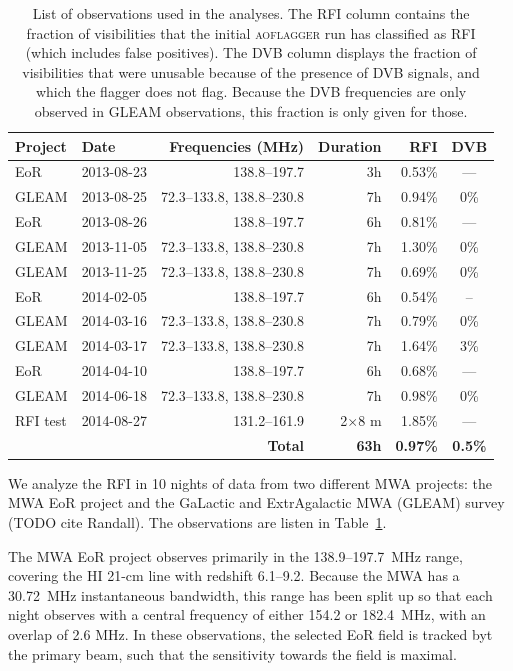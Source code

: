 \documentclass[useAMS,usenatbib]{mn2e}
\begin{document}
\begin{table}
\caption{List of observations used in the analyses. The RFI column contains the fraction of visibilities that the initial \textsc{aoflagger} run has classified as RFI (which includes false positives). The DVB column displays the fraction of visibilities that were unusable because of the presence of DVB signals, and which the flagger does not flag. Because the DVB frequencies are only observed in GLEAM observations, this fraction is only given for those. }\label{tbl:obs-list}
\begin{tabular}{|l|l|r|r|r|c|}
\hline
\textbf{Project} &\textbf{Date} & \textbf{Frequencies (MHz)} & \textbf{Duration} & RFI & DVB \\
\hline
EoR   & 2013-08-23 & 138.8--197.7              & 3h & 0.53\% & ---\\
GLEAM & 2013-08-25 & 72.3--133.8, 138.8--230.8 & 7h & 0.94\% & 0\% \\
EoR   & 2013-08-26 & 138.8--197.7              & 6h & 0.81\% & ---\\
GLEAM & 2013-11-05 & 72.3--133.8, 138.8--230.8 & 7h & 1.30\% & 0\% \\
GLEAM & 2013-11-25 & 72.3--133.8, 138.8--230.8 & 7h & 0.69\% & 0\% \\
EoR   & 2014-02-05 & 138.8--197.7              & 6h & 0.54\% & -- \\
GLEAM & 2014-03-16 & 72.3--133.8, 138.8--230.8 & 7h & 0.79\% & 0\% \\
GLEAM & 2014-03-17 & 72.3--133.8, 138.8--230.8 & 7h & 1.64\% & 3\% \\
EoR   & 2014-04-10 & 138.8--197.7              & 6h & 0.68\% & ---\\
GLEAM & 2014-06-18 & 72.3--133.8, 138.8--230.8 & 7h & 0.98\% & 0\% \\
RFI test&2014-08-27& 131.2--161.9     & 2$\times$8 m& 1.85\% & --- \\
\hline
\multicolumn{3}{|r|}{\textbf{Total}} & \textbf{63h} & \textbf{0.97\%} & \textbf{0.5\%}\\
\hline
\end{tabular}
\end{table}

We analyze the RFI in 10 nights of data from two different MWA projects: the MWA EoR project \citep{bowman-science-with-the-mwa-2013} and the GaLactic and ExtrAgalactic MWA (GLEAM) survey (TODO cite Randall). The observations are listen in Table~\ref{tbl:obs-list}.

The MWA EoR project observes primarily in the 138.9--197.7~MHz range, covering the HI 21-cm line with redshift 6.1--9.2. Because the MWA has a 30.72~MHz instantaneous bandwidth, this range has been split up so that each night observes with a central frequency of either 154.2 or 182.4~MHz, with an overlap of 2.6 MHz. In these observations, the selected EoR field is tracked byt the primary beam, such that the sensitivity towards the field is maximal.
\end{document}
